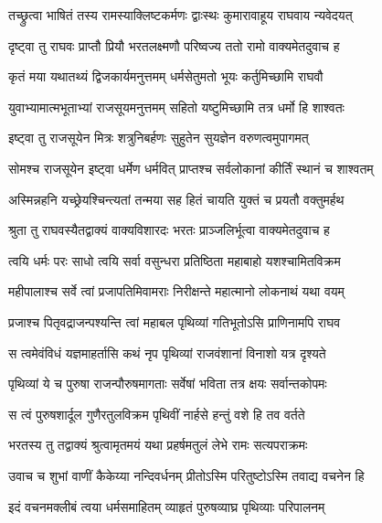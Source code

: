
\twolineshloka
{तच्छ्रुत्वा भाषितं तस्य रामस्याक्लिष्टकर्मणः}
{द्वाःस्थः कुमारावाहूय राघवाय न्यवेदयत्} %

\twolineshloka
{दृष्ट्वा तु राघवः प्राप्तौ प्रियौ भरतलक्ष्मणौ}
{परिष्वज्य ततो रामो वाक्यमेतदुवाच ह} %

\twolineshloka
{कृतं मया यथातथ्यं द्विजकार्यमनुत्तमम्}
{धर्मसेतुमतो भूयः कर्तुमिच्छामि राघवौ} %

\twolineshloka
{युवाभ्यामात्मभूताभ्यां राजसूयमनुत्तमम्}
{सहितो यष्टुमिच्छामि तत्र धर्मो हि शाश्वतः} %

\twolineshloka
{इष्ट्वा तु राजसूयेन मित्रः शत्रुनिबर्हणः}
{सुहुतेन सुयज्ञेन वरुणत्वमुपागमत्} %

\twolineshloka
{सोमश्च राजसूयेन इष्ट्वा धर्मेण धर्मवित्}
{प्राप्तश्च सर्वलोकानां कीर्तिं स्थानं च शाश्वतम्} %

\twolineshloka
{अस्मिन्नहनि यच्छ्रेयश्चिन्त्यतां तन्मया सह}
{हितं चायति युक्तं च प्रयतौ वक्तुमर्हथ} %

\twolineshloka
{श्रुता तु राघवस्यैतद्वाक्यं वाक्यविशारदः}
{भरतः प्राञ्जलिर्भूत्वा वाक्यमेतदुवाच ह} %

\twolineshloka
{त्वयि धर्मः परः साधो त्वयि सर्वा वसुन्धरा}
{प्रतिष्ठिता महाबाहो यशश्चामितविक्रम} %

\twolineshloka
{महीपालाश्च सर्वे त्वां प्रजापतिमिवामराः}
{निरीक्षन्ते महात्मानो लोकनाथं यथा वयम्} %

\twolineshloka
{प्रजाश्च पितृवद्राजन्पश्यन्ति त्वां महाबल}
{पृथिव्यां गतिभूतोऽसि प्राणिनामपि राघव} %

\twolineshloka
{स त्वमेवंविधं यज्ञमाहर्तासि कथं नृप}
{पृथिव्यां राजवंशानां विनाशो यत्र दृश्यते} %

\twolineshloka
{पृथिव्यां ये च पुरुषा राजन्पौरुषमागताः}
{सर्वेषां भविता तत्र क्षयः सर्वान्तकोपमः} %

\twolineshloka
{स त्वं पुरुषशार्दूल गुणैरतुलविक्रम}
{पृथिवीं नार्हसे हन्तुं वशे हि तव वर्तते} %

\twolineshloka
{भरतस्य तु तद्वाक्यं श्रुत्वामृतमयं यथा}
{प्रहर्षमतुलं लेभे रामः सत्यपराक्रमः} %

\twolineshloka
{उवाच च शुभां वाणीं कैकेय्या नन्दिवर्धनम्}
{प्रीतोऽस्मि परितुष्टोऽस्मि तवाद्य वचनेन हि} %

\twolineshloka
{इदं वचनमक्लीबं त्वया धर्मसमाहितम्}
{व्याहृतं पुरुषव्याघ्र पृथिव्याः परिपालनम्} %

